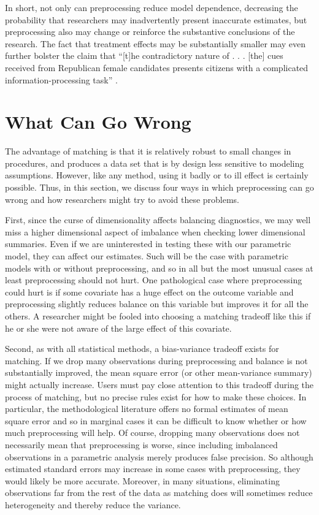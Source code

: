 \documentclass[11pt,titlepage]{article}
\begin{document}
In short, not only can preprocessing reduce model dependence,
decreasing the probability that researchers may inadvertently present
inaccurate estimates, but preprocessing also may change or reinforce
the substantive conclusions of the research.  The fact that treatment
effects may be substantially smaller may even further bolster the
claim that ``[t]he contradictory nature of . . .  [the] cues received
from Republican female candidates presents citizens with a complicated
information-processing task'' \citep[p.  460]{Koch02}.

\section{What Can Go Wrong}

The advantage of matching is that it is relatively robust to small
changes in procedures, and produces a data set that is by design less
sensitive to modeling assumptions.  However, like any method, using it
badly or to ill effect is certainly possible.  Thus, in this section,
we discuss four ways in which preprocessing can go wrong and how
researchers might try to avoid these problems.

First, since the curse of dimensionality affects balancing
diagnostics, we may well miss a higher dimensional aspect of imbalance
when checking lower dimensional summaries.  Even if we are
uninterested in testing these with our parametric model, they can
affect our estimates.  Such will be the case with parametric models
with or without preprocessing, and so in all but the most unusual
cases at least preprocessing should not hurt.  One pathological case
where preprocessing could hurt is if some covariate has a huge effect
on the outcome variable and preprocessing slightly reduces balance on
this variable but improves it for all the others.  A researcher might
be fooled into choosing a matching tradeoff like this if he or she
were not aware of the large effect of this covariate.

Second, as with all statistical methods, a bias-variance tradeoff
exists for matching.  If we drop many observations during
preprocessing and balance is not substantially improved, the mean
square error (or other mean-variance summary) might actually increase.
Users must pay close attention to this tradeoff during the process of
matching, but no precise rules exist for how to make these choices.
In particular, the methodological literature offers no formal
estimates of mean square error and so in marginal cases it can be
difficult to know whether or how much preprocessing will help.  Of
course, dropping many observations does not necessarily mean that
preprocessing is worse, since including imbalanced observations in a
parametric analysis merely produces false precision.  So although
estimated standard errors may increase in some cases with
preprocessing, they would likely be more accurate.  Moreover, in many
situations, eliminating observations far from the rest of the data as
matching does will sometimes reduce heterogeneity and thereby reduce
the variance.
\end{document}
